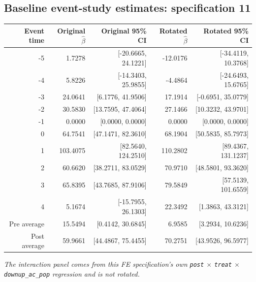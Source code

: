 \documentclass[10pt]{article}
\begin{document}
\subsection*{Baseline event-study estimates: specification 11}
\begin{center}
\scriptsize
\begin{tabular}{r rr rr}
\toprule
Event time & Original $\hat\beta$ & Original 95\% CI & Rotated $\hat\beta$ & Rotated 95\% CI \\
\midrule
-5 & 1.7278 & [-20.6665, 24.1221] & -12.0176 & [-34.4119, 10.3768] \\
-4 & 5.8226 & [-14.3403, 25.9855] & -4.4864 & [-24.6493, 15.6765] \\
-3 & 24.0641 & [6.1776, 41.9506] & 17.1914 & [-0.6951, 35.0779] \\
-2 & 30.5830 & [13.7595, 47.4064] & 27.1466 & [10.3232, 43.9701] \\
-1 & 0.0000 & [0.0000, 0.0000] & 0.0000 & [0.0000, 0.0000] \\
0 & 64.7541 & [47.1471, 82.3610] & 68.1904 & [50.5835, 85.7973] \\
1 & 103.4075 & [82.5640, 124.2510] & 110.2802 & [89.4367, 131.1237] \\
2 & 60.6620 & [38.2711, 83.0529] & 70.9710 & [48.5801, 93.3620] \\
3 & 65.8395 & [43.7685, 87.9106] & 79.5849 & [57.5139, 101.6559] \\
4 & 5.1674 & [-15.7955, 26.1303] & 22.3492 & [1.3863, 43.3121] \\
\midrule
Pre average & 15.5494 & [0.4142, 30.6845] & 6.9585 & [3.2934, 10.6236] \\
Post average & 59.9661 & [44.4867, 75.4455] & 70.2751 & [43.9526, 96.5977] \\
\bottomrule
\end{tabular}
\end{center}
\medskip
\textit{The interaction panel comes from this FE specification's own \texttt{post} $\times$ \texttt{treat} $\times$ \texttt{downup\_ac\_pop} regression and is not rotated.}
\clearpage
\end{document}
